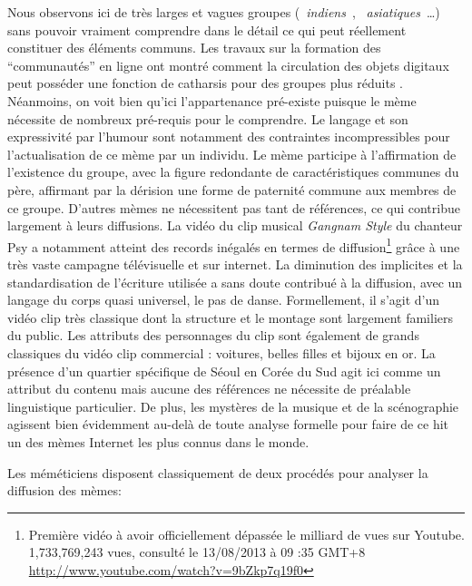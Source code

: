 Nous observons ici de très larges et vagues groupes ({\guillemotleft}~\textit{indiens}~{\guillemotright}, {\guillemotleft}~\textit{asiatiques}~{\guillemotright}{\dots}) sans pouvoir vraiment comprendre dans le détail ce qui peut réellement constituer des éléments communs. Les travaux sur la formation des {\textquotedblleft}communautés{\textquotedblright} en ligne ont montré comment la circulation des objets digitaux peut posséder une fonction de catharsis pour des groupes plus réduits \citep{Steyer2006}. Néanmoins, on voit bien qu{\textquoteright}ici l{\textquoteright}appartenance pré-existe puisque le mème nécessite de nombreux pré-requis pour le comprendre. Le langage et son expressivité par l{\textquoteright}humour sont notamment des contraintes incompressibles pour l{\textquoteright}actualisation de ce mème par un individu. Le mème participe à l{\textquoteright}affirmation de l{\textquoteright}existence du groupe, avec la figure redondante de caractéristiques communes du père, affirmant par la dérision une forme de paternité commune aux membres de ce groupe. D{\textquoteright}autres mèmes ne nécessitent pas tant de références, ce qui contribue largement à leurs diffusions. La vidéo du clip musical \textit{Gangnam Style} du chanteur Psy a notamment atteint des records inégalés en termes de diffusion\footnote{ Première vidéo à avoir officiellement dépassée le milliard de vues sur Youtube. 1,733,769,243 vues, consulté le 13/08/2013 à 09 :35 GMT+8 \url{http://www.youtube.com/watch?v=9bZkp7q19f0}} gr\^ace à une très vaste campagne télévisuelle et sur internet. La diminution des implicites et la standardisation de l{\textquoteright}écriture utilisée a sans doute contribué à la diffusion, avec un langage du corps quasi universel, le pas de danse. Formellement, il s{\textquoteright}agit d{\textquoteright}un vidéo clip très classique dont la structure et le montage sont largement familiers du public. Les attributs des personnages du clip sont également de grands classiques du vidéo clip commercial : voitures, belles filles et bijoux en or. La présence d{\textquoteright}un quartier spécifique de Séoul en Corée du Sud agit ici comme un attribut du contenu mais aucune des références ne nécessite de préalable linguistique particulier. De plus, les mystères de la musique et de la scénographie agissent bien évidemment au-delà de toute analyse formelle pour faire de ce hit un des mèmes Internet les plus connus dans le monde. 

Les méméticiens disposent classiquement de deux procédés pour analyser la diffusion des mèmes: 

